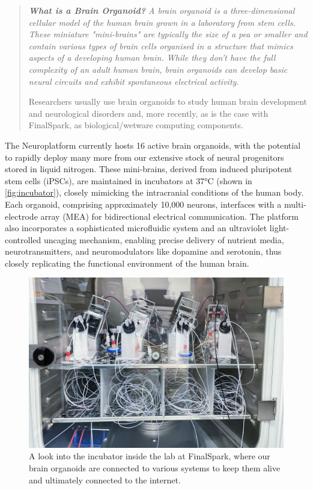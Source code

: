 \documentclass[10pt]{article}
\begin{document}
\begin{sloppypar}
  \begin{quote}
    \itshape
    \textbf{What is a Brain Organoid?}
    A brain organoid is a three-dimensional cellular model of the human brain grown in a laboratory from stem cells. These miniature "mini-brains" are typically the size of a pea or smaller and contain various types of brain cells organised in a structure that mimics aspects of a developing human brain. While they don't have the full complexity of an adult human brain, brain organoids can develop basic neural circuits and exhibit spontaneous electrical activity.

    Researchers usually use brain organoids to study human brain development and neurological disorders and, more recently, as is the case with FinalSpark, as biological/wetware computing components.
  \end{quote}

  The Neuroplatform currently hosts 16 active brain organoids, with the potential to rapidly deploy many more from our extensive stock of neural progenitors stored in liquid nitrogen. These mini-brains, derived from induced pluripotent stem cells (iPSCs), are maintained in incubators at 37°C (shown in \autoref{fig:incubator}), closely mimicking the intracranial conditions of the human body. Each organoid, comprising approximately 10,000 neurons, interfaces with a multi-electrode array (MEA) for bidirectional electrical communication. The platform also incorporates a sophisticated microfluidic system and an ultraviolet light-controlled uncaging mechanism, enabling precise delivery of nutrient media, neurotransmitters, and neuromodulators like dopamine and serotonin, thus closely replicating the functional environment of the human brain.

  \begin{figure}
    \centering
    \includegraphics[width=1\textwidth]{figures/incubator.jpg}
    \caption{A look into the incubator inside the lab at FinalSpark, where our brain organoids are connected to various systems to keep them alive and ultimately connected to the internet.}
    \label{fig:incubator}
  \end{figure}


  \pagebreak
  
  
  \nocite{*}

\end{sloppypar}
\end{document}
